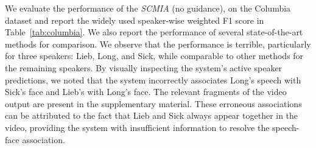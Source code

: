 We evaluate the performance of the \emph{SCMIA} (no guidance), on the Columbia dataset and report the widely used speaker-wise weighted F1 score in Table~\ref{tab:columbia}. We also report the performance of several state-of-the-art methods for comparison. We observe that the performance is terrible, particularly for three speakers: Lieb, Long, and Sick, while comparable to other methods for the remaining speakers. By visually inspecting the system's active speaker predictions, we noted that the system incorrectly associates Long's speech with Sick's face and Lieb's with Long's face. The relevant fragments of the video output are present in the supplementary material. These erroneous associations can be attributed to the fact that Lieb and Sick always appear together in the video, providing the system with insufficient information to resolve the speech-face association. 
\begin{table}[tb]
\centering
\caption{Comparison of the speaker-wise weighted F1 scores for all the speakers in Columbia dataset.}
\label{tab:columbia}
\end{table}


